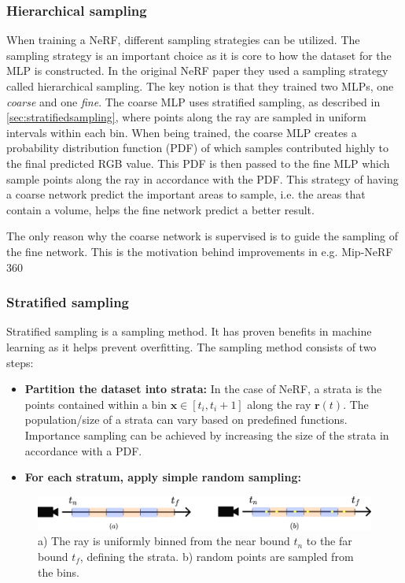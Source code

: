 \subsubsection{Hierarchical sampling} \label{sec:hierarchicalsampling}
When training a NeRF, different sampling strategies can be utilized. The sampling strategy is an important choice as it is core to how the dataset for the MLP is constructed. In the original NeRF paper they used a sampling strategy called hierarchical sampling. The key notion is that they trained two MLPs, one \textit{coarse} and one \textit{fine}. The coarse MLP uses stratified sampling, as described in \autoref{sec:stratifiedsampling}, where points along the ray are sampled in uniform intervals within each bin. When being trained, the coarse MLP creates a probability distribution function (PDF) of which samples contributed highly to the final predicted RGB value. This PDF is then passed to the fine MLP which sample points along the ray in accordance with the PDF. This strategy of having a coarse network predict the important areas to sample, i.e. the areas that contain a volume, helps the fine network predict a better result. \cite{mildenhall_nerf_2020}

The only reason why the coarse network is supervised is to guide the sampling of the fine network. This is the motivation behind improvements in e.g. Mip-NeRF 360

\subsubsection{Stratified sampling} \label{sec:stratifiedsampling}
Stratified sampling is a sampling method. It has proven benefits in machine learning as it helps prevent overfitting. The sampling method consists of two steps:

\begin{itemize}
    \item \textbf{Partition the dataset into strata:} In the case of NeRF, a strata is the points contained within a bin $\pmb{x} \in [t_i, t_i+1]$ along the ray $\pmb{r}(t)$. The population/size of a strata can vary based on predefined functions. Importance sampling can be achieved by increasing the size of the strata in accordance with a PDF.
    \item \textbf{For each stratum, apply simple random sampling:} 
\end{itemize}

\begin{figure}[h]
    \centering
    \includegraphics[width=1.0\textwidth]{figures/StratifiedSampling.png}
    \caption{a) The ray is uniformly binned from the near bound $t_n$ to the far bound $t_f$, defining the strata. b) random points are sampled from the bins.}
    \label{fig:stratifiedsampling}
\end{figure}

